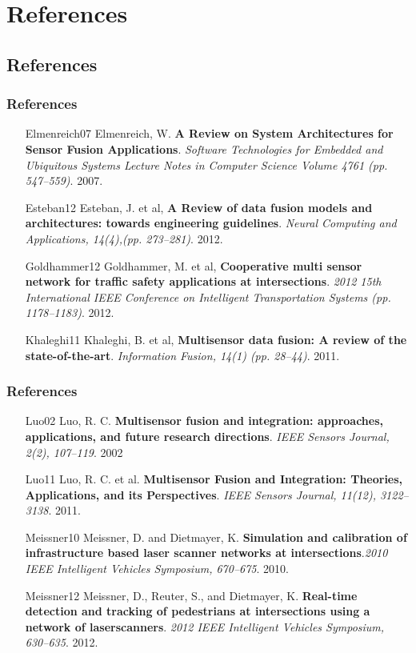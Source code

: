 \documentclass[table]{beamer}
\begin{document}
\section{References}
\subsection{References}
\frame
{
	\frametitle{References}
	\footnotesize{	
	\begin{itemize}[leftmargin=.6in]
		\item [Elmenreich07] Elmenreich, W. \textbf{A Review on System Architectures for Sensor Fusion Applications}. \textit{Software Technologies for Embedded and Ubiquitous Systems
Lecture Notes in Computer Science Volume 4761 (pp. 547–559)}. 2007.
		\item [Esteban12] Esteban, J. et al, \textbf{A Review of data fusion models and architectures: towards 	engineering guidelines}. \textit{Neural Computing and Applications, 14(4),(pp. 273–281)}. 2012.
		\item [Goldhammer12] Goldhammer, M. et al, \textbf{Cooperative multi sensor network for traffic safety applications at intersections}. \textit{2012 15th International IEEE Conference on Intelligent Transportation Systems (pp. 1178–1183)}. 2012.
		\item [Khaleghi11] Khaleghi, B. et al, \textbf{Multisensor data fusion: A review of the state-of-the-art}. \textit{Information Fusion, 14(1) (pp. 28–44)}. 2011.
	\end{itemize}
	}
}

\frame
{
	\frametitle{References}
	\footnotesize{	
	\begin{itemize}[leftmargin=.6in]
		\item [Luo02] Luo, R. C. \textbf{Multisensor fusion and integration: approaches, applications, and future research directions}. \textit{IEEE Sensors Journal, 2(2), 107–119}. 2002
		\item [Luo11] Luo, R. C. et al. \textbf{Multisensor Fusion and Integration: Theories, Applications, and its Perspectives}. \textit{IEEE Sensors Journal, 11(12), 3122–3138}. 2011.
	    \item [Meissner10] Meissner, D. and Dietmayer, K. \textbf{Simulation and calibration of infrastructure based laser scanner networks at intersections}.\textit{2010 IEEE Intelligent Vehicles Symposium, 670–675}. 2010.
	    \item [Meissner12] Meissner, D., Reuter, S., and Dietmayer, K. \textbf{Real-time detection and tracking of pedestrians at intersections using a network of laserscanners}. \textit{2012 IEEE Intelligent Vehicles Symposium, 630–635}. 2012.
	\end{itemize}
	}
}
\end{document}
